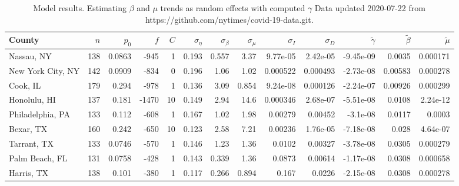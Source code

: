 \documentclass[12pt,letterpaper]{article}
\begin{document}
\begin{sidewaystable}
\caption{\label{tab:uncons}
Model results. Estimating $\beta$ and $\mu$ trends as random effects
with computed $\gamma$
Data updated 2020-07-22 from
https://github.com/nytimes/covid-19-data.git.
}
\centering
{\scriptsize


\begin{tabular}{lrrrrrrrrrrrr}
\hline
 County            &   $n$ &   $p_0$ &   $f$ &   $C$ &   $\sigma_\eta$ &   $\sigma_\beta$ &   $\sigma_\mu$ &   $\sigma_I$ &   $\sigma_D$ &   $\tilde\gamma$ &   $\tilde{\beta}$ &   $\tilde{\mu}$ \\
\hline
 Nassau, NY        &   138 &  0.0863 &  -945 &     1 &           0.193 &            0.557 &          3.37  &     9.77e-05 &     2.42e-05 &        -9.45e-09 &           0.0035  &        0.000171 \\
 New York City, NY &   142 &  0.0909 &  -834 &     0 &           0.196 &            1.06  &          1.02  &     0.000522 &     0.000493 &        -2.73e-08 &           0.00583 &        0.000278 \\
 Cook, IL          &   179 &  0.294  &  -978 &     1 &           0.136 &            3.09  &          0.854 &     9.24e-08 &     0.000126 &        -2.24e-07 &           0.00926 &        0.000299 \\
 Honolulu, HI      &   137 &  0.181  & -1470 &    10 &           0.149 &            2.94  &         14.6   &     0.000346 &     2.68e-07 &        -5.51e-08 &           0.0108  &        2.24e-12 \\
 Philadelphia, PA  &   133 &  0.112  &  -608 &     1 &           0.167 &            1.02  &          1.98  &     0.00279  &     0.00452  &        -3.1e-08  &           0.0117  &        0.0003   \\
 Bexar, TX         &   160 &  0.242  &  -650 &    10 &           0.123 &            2.58  &          7.21  &     0.00236  &     1.76e-05 &        -7.18e-08 &           0.028   &        4.64e-07 \\
 Tarrant, TX       &   133 &  0.0746 &  -570 &     1 &           0.146 &            1.23  &          1.36  &     0.0102   &     0.00327  &        -3.78e-08 &           0.0305  &        0.000279 \\
 Palm Beach, FL    &   131 &  0.0758 &  -428 &     1 &           0.143 &            0.339 &          1.36  &     0.0873   &     0.00614  &        -1.17e-08 &           0.0308  &        0.000658 \\
 Harris, TX        &   138 &  0.101  &  -380 &     1 &           0.117 &            0.266 &          0.894 &     0.167    &     0.0226   &        -2.15e-08 &           0.0308  &        0.000278 \\

\end{tabular}}
\end{sidewaystable}
\end{document}
